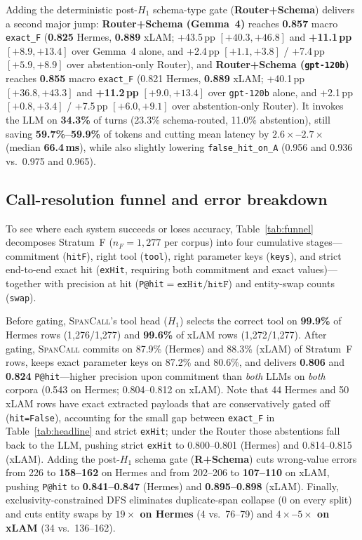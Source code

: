 Adding the deterministic post-$H_1$ schema-type gate (\textbf{Router+Schema}) delivers a second major jump: \textbf{Router+Schema (Gemma~4)} reaches \textbf{0.857} macro \texttt{exact\_F} (\textbf{0.825} Hermes, \textbf{0.889} xLAM; +43.5\,pp $[+40.3, +46.8]$ and \textbf{+11.1\,pp} $[+8.9, +13.4]$ over Gemma~4 alone, and +2.4\,pp $[+1.1, +3.8]$ / +7.4\,pp $[+5.9, +8.9]$ over abstention-only Router), and \textbf{Router+Schema (\texttt{gpt-120b})} reaches \textbf{0.855} macro \texttt{exact\_F} (0.821 Hermes, \textbf{0.889} xLAM; +40.1\,pp $[+36.8, +43.3]$ and \textbf{+11.2\,pp} $[+9.0, +13.4]$ over \texttt{gpt-120b} alone, and +2.1\,pp $[+0.8, +3.4]$ / +7.5\,pp $[+6.0, +9.1]$ over abstention-only Router). It invokes the LLM on \textbf{34.3\%} of turns (23.3\% schema-routed, 11.0\% abstention), still saving \textbf{59.7\%--59.9\%} of tokens and cutting mean latency by \textbf{$2.6\times$--$2.7\times$} (median \textbf{66.4\,ms}), while also slightly lowering \texttt{false\_hit\_on\_A} (0.956 and 0.936 vs.\ 0.975 and 0.965).

\subsection{Call-resolution funnel and error breakdown}
\label{sec:results:funnel}
To see where each system succeeds or loses accuracy, Table~\ref{tab:funnel} decomposes Stratum~F ($n_F{=}1{,}277$ per corpus) into four cumulative stages---commitment (\texttt{hitF}), right tool (\texttt{tool}), right parameter keys (\texttt{keys}), and strict end-to-end exact hit (\texttt{exHit}, requiring both commitment and exact values)---together with precision at hit (\texttt{P@hit}${=}\texttt{exHit}/\texttt{hitF}$) and entity-swap counts (\texttt{swap}).

Before gating, \textsc{SpanCall}'s tool head ($H_1$) selects the correct tool on \textbf{99.9\%} of Hermes rows (1,276/1,277) and \textbf{99.6\%} of xLAM rows (1,272/1,277). After gating, \textsc{SpanCall} commits on 87.9\% (Hermes) and 88.3\% (xLAM) of Stratum~F rows, keeps exact parameter keys on 87.2\% and 80.6\%, and delivers \textbf{0.806} and \textbf{0.824} \texttt{P@hit}---higher precision upon commitment than \emph{both} LLMs on \emph{both} corpora (0.543 on Hermes; 0.804--0.812 on xLAM). Note that 44 Hermes and 50 xLAM rows have exact extracted payloads that are conservatively gated off (\texttt{hit=False}), accounting for the small gap between \texttt{exact\_F} in Table~\ref{tab:headline} and strict \texttt{exHit}; under the Router those abstentions fall back to the LLM, pushing strict \texttt{exHit} to 0.800--0.801 (Hermes) and 0.814--0.815 (xLAM). Adding the post-$H_1$ schema gate (\textbf{R+Schema}) cuts wrong-value errors from 226 to \textbf{158--162} on Hermes and from 202--206 to \textbf{107--110} on xLAM, pushing \texttt{P@hit} to \textbf{0.841--0.847} (Hermes) and \textbf{0.895--0.898} (xLAM). Finally, exclusivity-constrained DFS eliminates duplicate-span collapse (0 on every split) and cuts entity swaps by \textbf{$19\times$ on Hermes} (4 vs.\ 76--79) and \textbf{$4\times$--$5\times$ on xLAM} (34 vs.\ 136--162).

